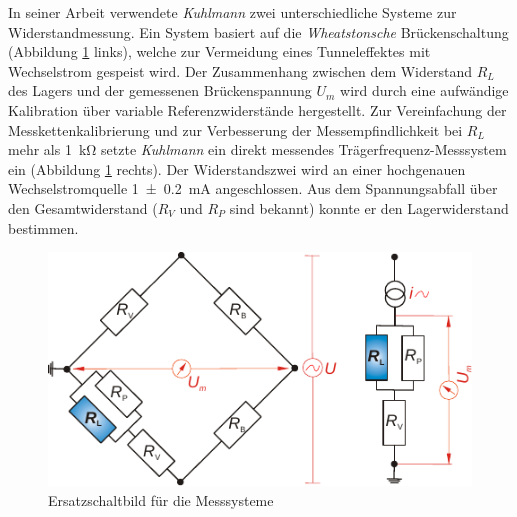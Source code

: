 In seiner Arbeit \cite{kuhlmann_2009} verwendete \textit{Kuhlmann} zwei unterschiedliche Systeme zur Widerstandmessung.
Ein System basiert auf die \textit{Wheatstonsche} Brückenschaltung (Abbildung \ref{fig:ersatzschaltbild_messsysteme_kuhlmann} links), welche zur Vermeidung eines Tunneleffektes mit Wechselstrom gespeist wird.
Der Zusammenhang zwischen dem Widerstand $R_L$ des Lagers und der gemessenen Brückenspannung $U_m$ wird durch eine aufwändige Kalibration über variable Referenzwiderstände hergestellt.
Zur Vereinfachung der Messkettenkalibrierung und zur Verbesserung der Messempfindlichkeit bei $R_L$ mehr als \SI{1}{\kilo\ohm} setzte \textit{Kuhlmann} ein direkt messendes Trägerfrequenz-Messsystem ein (Abbildung \ref{fig:ersatzschaltbild_messsysteme_kuhlmann} rechts).
Der Widerstandszwei wird an einer hochgenauen Wechselstromquelle \SI[separate-uncertainty]{1 +- 0.2}{\milli\ampere} angeschlossen.
Aus dem Spannungsabfall über den Gesamtwiderstand ($R_V$ und $R_P$ sind bekannt) konnte er den Lagerwiderstand bestimmen.
\begin{figure}[htb]
    \centering
    \includegraphics[]{./images/ersatzschaltbild_kuhlmann.pdf}
    \caption{Ersatzschaltbild für die Messsysteme \cite{kuhlmann_2009}}
    \label{fig:ersatzschaltbild_messsysteme_kuhlmann}
\end{figure}
%

